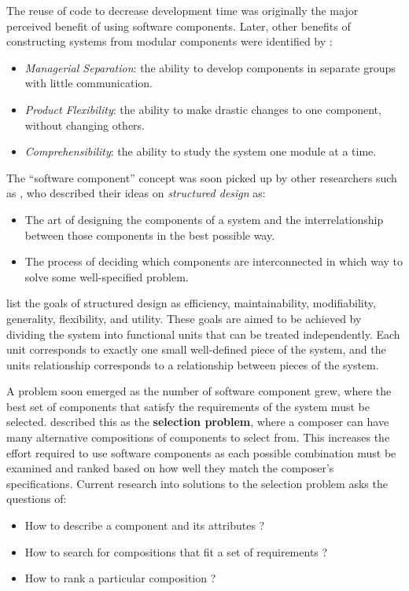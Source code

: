 The reuse of code to decrease development time was originally the major perceived benefit of using software components.
Later, other benefits of constructing systems from modular components were identified by \cite{Parnas1972}:
\begin{itemize}
  \item \textit{Managerial Separation}: the ability to develop components in separate groups with little communication.
  \item \textit{Product Flexibility}: the ability to make drastic changes to one component, without changing others.
  \item \textit{Comprehensibility}: the ability to study the system one module at a time.
\end{itemize}

The ``software component'' concept was soon picked up by other researchers such as \cite{Yourdon1976}, who described their ideas on \textit{structured design} as:
\begin{itemize}
  \item The art of designing the components of a system and the interrelationship between those components in the best possible way.
  \item The process of deciding which components are interconnected in which way to solve some well-specified problem.
\end{itemize}
\cite{Yourdon1976} list the goals of structured design as efficiency, maintainability, modifiability, generality, flexibility, and utility.
These goals are aimed to be achieved by dividing the system into functional units that can be treated independently.
Each unit corresponds to exactly one small well-defined piece of the system, and the units relationship corresponds to a relationship between pieces of the system.

A problem soon emerged as the number of software component grew,  where the best set of components that satisfy the requirements of the system must be selected.
\cite{PrietoDiaz1987} described this as the \textbf{selection problem}, where a composer can have many alternative compositions of components to select from.
This increases the effort required to use software components as each possible combination must be examined and ranked based on how well they match the composer's specifications.
Current research into solutions to the selection problem asks the questions of:
\begin{itemize}
  \item How to describe a component and its attributes \citep{treinen2009common,Xinjuan2007}?
  \item How to search for compositions that fit a set of requirements \citep{abate2011,Kwong2010,Treinen2009,DeAlmeida2004}?
  \item How to rank a particular composition \citep{Chen2011,Aleti2009}?
\end{itemize}

